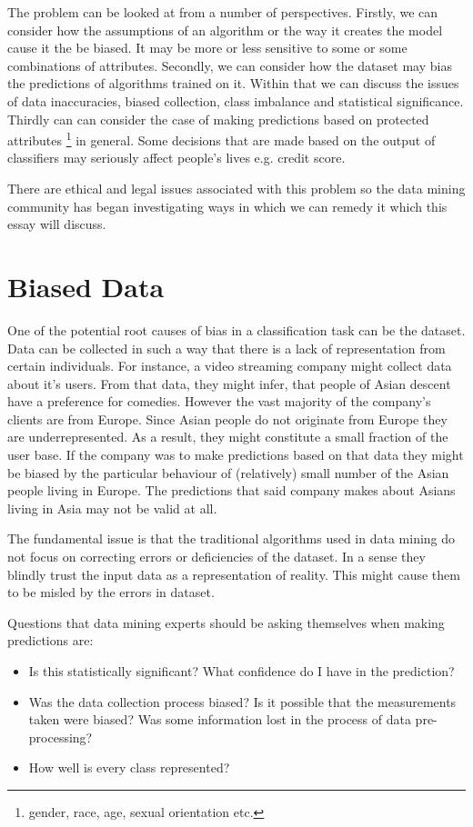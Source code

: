 \documentclass[a4paper, 12pt, titlepage]{article}
\begin{document}
The problem can be looked at from a number of perspectives. Firstly, we can consider how the assumptions of an algorithm or the way it creates the model cause it the be biased. It may be more or less sensitive to some or some combinations of attributes. Secondly, we can consider how the dataset may bias the predictions of algorithms trained on it. Within that we can discuss the issues of data inaccuracies, biased collection, class imbalance and statistical significance. Thirdly can can consider the case of making predictions based on protected attributes \footnote{gender, race, age, sexual orientation etc.} in general. Some decisions that are made based on the output of classifiers may seriously affect people's lives e.g. credit score.

There are ethical and legal issues associated with this problem so the data mining community has began investigating ways in which we can remedy it which this essay will discuss.

\section*{Biased Data}

One of the potential root causes of bias in a classification task can be the dataset. Data can be collected in such a way that there is a lack of representation from certain individuals. For instance, a video streaming company might collect data about it's users. From that data, they might infer, that people of Asian descent have a preference for comedies. However the vast majority of the company's clients are from Europe. Since Asian people do not originate from Europe they are underrepresented. As a result, they might constitute a small fraction of the user base. If the company was to make predictions based on that data they might be biased by the particular behaviour of (relatively) small number of the Asian people living in Europe. The predictions that said company makes about Asians living in Asia may not be valid at all.

The fundamental issue is that the traditional algorithms used in data mining do not focus on correcting errors or deficiencies of the dataset. In a sense they blindly trust the input data as a representation of reality. This might cause them to be misled by the errors in dataset.

Questions that data mining experts should be asking themselves when making predictions are:

\begin{itemize}		
  \item Is this statistically significant? What confidence do I have in the prediction?
  \item Was the data collection process biased? Is it possible that the measurements taken were biased? Was some information lost in the process of data pre-processing?
  \item How well is every class represented?
\end{itemize}		
\end{document}
